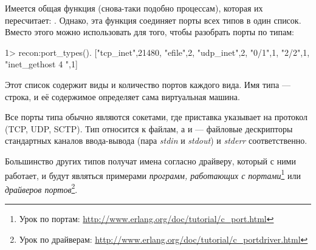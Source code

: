 Имеется общая функция (снова-таки подобно процессам), которая их пересчитает: . Однако, эта функция соединяет порты всех типов в один список. Вместо этого можно использовать  для того, чтобы разобрать порты по типам:

\begin{VerbatimEshell}
1> recon:port_types().
[{"tcp_inet",21480},
 {"efile",2},
 {"udp_inet",2},
 {"0/1",1},
 {"2/2",1},
 {"inet_gethost 4 ",1}]
 \end{VerbatimEshell}

Этот список содержит виды и количество портов каждого вида. Имя типа --- строка, и её содержимое определяет сама виртуальная машина.

Все порты типа  обычно являются сокетами, где приставка указывает на протокол (TCP, UDP, SCTP). Тип  относится к файлам, а  и  --- файловые дескрипторы стандартных каналов ввода-вывода (пара \emph{stdin} и \emph{stdout}) и \emph{stderr} соответственно.

Большинство других типов получат имена согласно драйверу, который с ними работает, и будут являться примерами \emph{программ, работающих с портами}\footnote{Урок по портам: \href{http://www.erlang.org/doc/tutorial/c\_port.html}{http://www.erlang.org/doc/tutorial/c\_port.html}} или \emph{драйверов портов}\footnote{Урок по драйверам: \href{http://www.erlang.org/doc/tutorial/c\_portdriver.html}{http://www.erlang.org/doc/tutorial/c\_portdriver.html}}.

